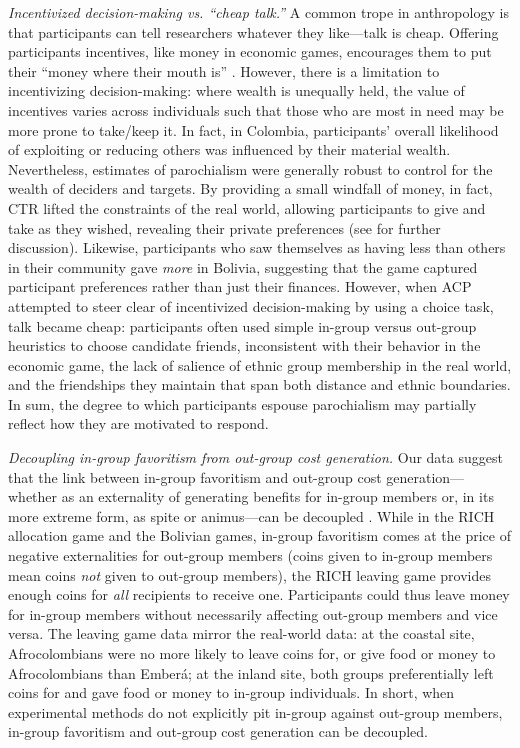 \documentclass[bibauthoryear]{aa}
\begin{document}
\emph{Incentivized decision-making vs. ``cheap talk.''} A common trope in anthropology is that participants can tell researchers whatever they like---talk is cheap. Offering participants incentives, like money in economic games, encourages them to put their ``money where their mouth is'' \citep{xygalatasreligious, gurven2008collective, Pisor2020}. However, there is a limitation to incentivizing decision-making: where wealth is unequally held, the value of incentives varies across individuals such that those who are most in need may be more prone to take/keep it. In fact, in Colombia, participants' overall likelihood of exploiting or reducing others was influenced by their material wealth. Nevertheless, estimates of parochialism were generally robust to control for the wealth of deciders and targets. By providing a small windfall of money, in fact, CTR lifted the constraints of the real world, allowing participants to give and take as they wished, revealing their private preferences (see \citet{Pisor2020} for further discussion). Likewise, participants who saw themselves as having less than others in their community gave \emph{more} in Bolivia, suggesting that the game captured participant preferences rather than just their finances. However, when ACP attempted to steer clear of incentivized decision-making by using a choice task, talk became cheap: participants often used simple in-group versus out-group heuristics to choose candidate friends, inconsistent with their behavior in the economic game, the lack of salience of ethnic group membership in the real world, and the friendships they maintain that span both distance and ethnic boundaries. In sum, the degree to which participants espouse parochialism may partially reflect how they are motivated to respond.

\emph{Decoupling in-group favoritism from out-group cost generation.} Our data suggest that the link between in-group favoritism and out-group cost generation---whether as an externality of generating benefits for in-group members or, in its more extreme form, as spite or animus---can be decoupled \citep[see also][]{cashdan2001ethnocentrism, hruschka2013economic, schaub2017threat, yamagishi2016parochial}. While in the RICH allocation game and the Bolivian games, in-group favoritism comes at the price of negative externalities for out-group members (coins given to in-group members mean coins \emph{not} given to out-group members), the RICH leaving game provides enough coins for \emph{all} recipients to receive one. Participants could thus leave money for in-group members without necessarily affecting out-group members and vice versa. The leaving game data mirror the real-world data: at the coastal site, Afrocolombians were no more likely to leave coins for, or give food or money to Afrocolombians than Ember\'a; at the inland site, both groups preferentially left coins for and gave food or money to in-group individuals. In short, when experimental methods do not explicitly pit in-group against out-group members, in-group favoritism and out-group cost generation can be decoupled.
\end{document}
